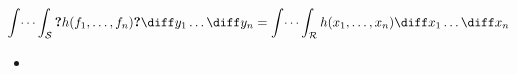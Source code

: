 \begin{frame}
\begin{columns}
\end{columns}
$\displaystyle \int\dots\int_{\mathcal S} \textbf{?} h(f_1,\dots, f_n) \textbf{?}  \diff y_1 \dots \diff y_n   =\int\dots\int_{\mathcal R} h(x_1,\dots, x_n)\diff x_1 \dots \diff x_n$
 
\begin{itemize}
\item 
\end{itemize}

\end{frame}